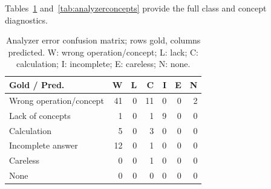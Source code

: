 Tables~\ref{tab:analyzerconfusion} and~\ref{tab:analyzerconcepts} provide the full class and concept diagnostics.
\begin{table}[htbp]\centering\small
\caption{Analyzer error confusion matrix; rows gold, columns predicted. W: wrong operation/concept; L: lack; C: calculation; I: incomplete; E: careless; N: none.}\label{tab:analyzerconfusion}
\begin{tabular}{@{}lrrrrrr@{}}\toprule
Gold / Pred. & W & L & C & I & E & N\\\midrule
Wrong operation/concept & 41 & 0 & 11 & 0 & 0 & 2\\
Lack of concepts & 1 & 0 & 1 & 9 & 0 & 0\\
Calculation & 5 & 0 & 3 & 0 & 0 & 0\\
Incomplete answer & 12 & 0 & 1 & 0 & 0 & 0\\
Careless & 0 & 0 & 1 & 0 & 0 & 0\\
None & 0 & 0 & 0 & 0 & 0 & 0\\
\bottomrule\end{tabular}\end{table}
